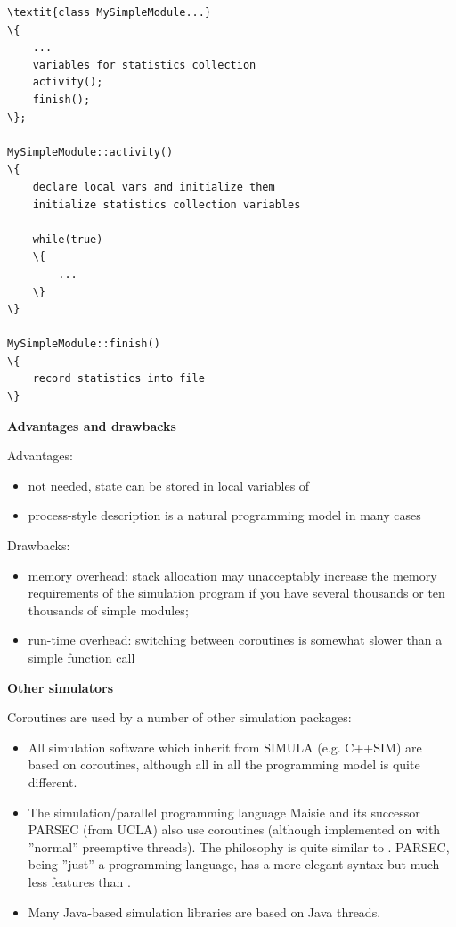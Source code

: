 \begin{Verbatim}[commandchars=\\\{\}]
\textit{class MySimpleModule...}
\{
    ...
    variables for statistics collection
    activity();
    finish();
\};

MySimpleModule::activity()
\{
    declare local vars and initialize them
    initialize statistics collection variables

    while(true)
    \{
        ...
    \}
\}

MySimpleModule::finish()
\{
    record statistics into file
\}
\end{Verbatim}



\textbf{Advantages and drawbacks}

Advantages:
\begin{itemize}
\item{ not needed, state can be stored in local
    variables of }
\item{process-style description is a natural programming model in many
    cases}
\end{itemize}

Drawbacks:
\begin{itemize}
\item{memory overhead: stack allocation may unacceptably increase the
    memory requirements of the simulation program if you have several
    thousands or ten thousands of simple modules;}
\item{run-time overhead: switching between coroutines is somewhat slower
    than a simple function call}
\end{itemize}


\textbf{Other simulators}


Coroutines are used by a number of other simulation packages:
\begin{itemize}
\item{All simulation software which inherit from SIMULA (e.g. C++SIM)
    are based on coroutines, although all in all the programming
    model is quite different.}
\item{The simulation/parallel programming language Maisie and its successor
    PARSEC (from UCLA) also use coroutines (although implemented
    on with ''normal'' preemptive threads). The philosophy
    is quite similar to {\opp}. PARSEC, being ''just''
    a programming language, has a more elegant syntax but much less
    features than {\opp}.}
\item{Many Java-based simulation libraries are based on Java
    threads.}
\end{itemize}



